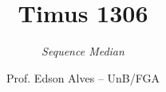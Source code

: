 \title{Timus 1306}
\subtitle{\textit{Sequence Median}}
\author{Prof. Edson Alves -- UnB/FGA}
\date{}
